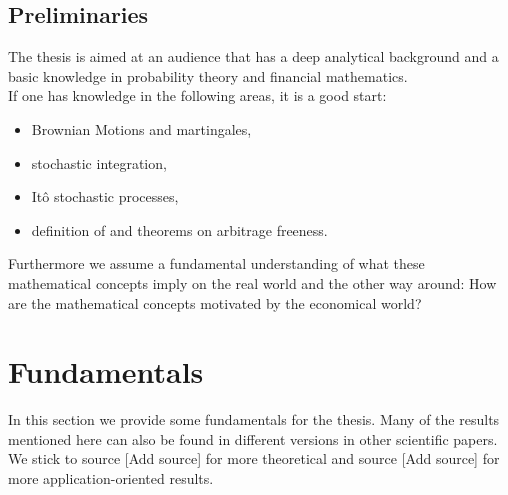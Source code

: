 \documentclass[12pt]{article}
\begin{document}
	\subsection{Preliminaries}
	The thesis is aimed at an audience that has a deep analytical background and a basic knowledge in probability theory and financial mathematics.\\
	\color{red}If one has knowledge in the following areas, it is a good start:\color{black}
	\begin{itemize}
		\item Brownian Motions and martingales,
		\item stochastic integration,
		\item Itô stochastic processes,
		\item definition of and theorems on arbitrage freeness.
	\end{itemize}
	Furthermore we assume a fundamental understanding of what these mathematical concepts imply on the real world and the other way around: How are the mathematical concepts motivated by the economical world?
	
	
	
	
	
	
	
	\pagebreak
	\section{Fundamentals}
	In this section we provide some fundamentals for the thesis. Many of the results mentioned here can also be found in different versions in other scientific papers. We stick to source 
	\color{red}[Add source] \color{black} %
	for more theoretical and source 
	\color{red}[Add source] \color{black} %
	for more application-oriented results.
	
\end{document}

